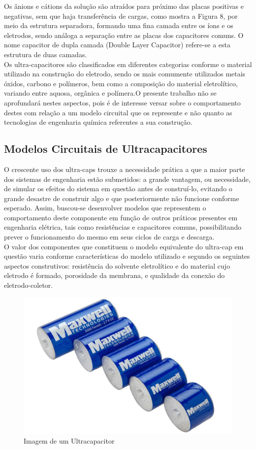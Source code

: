 \documentclass[11pt, a4paper, oneside]{article}
\begin{document}
Os ânions e cátions da solução são atraídos para próximo das placas
positivas e negativas, sem que haja transferência de cargas, como mostra a Figura
8, por meio da estrutura separadora, formando uma fina camada entre os íons e os
eletrodos, sendo análoga a separação entre as placas dos capacitores comuns. O
nome capacitor de dupla camada (Double Layer Capacitor) refere-se a esta
estrutura de duas camadas.\\
Os ultra-capacitores são classificados em diferentes categorias conforme o
material utilizado na construção do eletrodo, sendo os mais comumente utilizados
metais óxidos, carbono e polímeros, bem como a composição do material
eletrolítico, variando entre aquosa, orgânica e polímera.O presente
trabalho não se aprofundará nestes aspectos, pois é de interesse versar sobre o
comportamento destes com relação a um modelo circuital que os represente e não
quanto as tecnologias de engenharia química referentes a sua construção.

\subsection{Modelos Circuitais de Ultracapacitores}
O crescente uso dos ultra-caps trouxe a necessidade prática a que a maior
parte dos sistemas de engenharia estão submetidos: a grande vantagem, ou
necessidade, de simular os efeitos do sistema em questão antes de construí-lo,
evitando o grande desastre de construir algo e que posteriormente não funcione
conforme esperado. Assim, buscou-se desenvolver modelos que representem o
comportamento deste componente em função de outros práticos presentes em
engenharia elétrica, tais como resistências e capacitores comuns, possibilitando
prever o funcionamento do mesmo em seus ciclos de carga e descarga.\\
O valor dos componentes que constituem o modelo equivalente do ultra-cap
em questão varia conforme características do modelo utilizado e segundo os
seguintes aspectos construtivos: resistência do solvente eletrolítico e do material
cujo eletrodo é formado, porosidade da membrana, e qualidade da conexão do
eletrodo-coletor.

\begin{figure}[h!]
\centering
\includegraphics[width=\linewidth]{ultracapacitores}
\caption{Imagem de um Ultracapacitor \cite{ultracapacitor_figura}}
\label{fig:ultracapacitor}
\end{figure}
\end{document}
